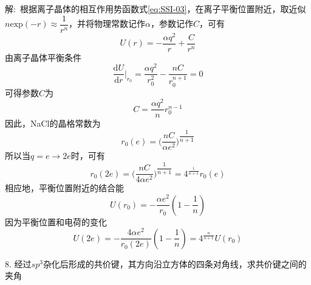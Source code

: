 解:~根据离子晶体的相互作用势函数式\eqref{eq:SSI-03}，在离子平衡位置附近，取近似
$n\mathrm{exp}(-r)\approx\dfrac1{r^n}$，并将物理常数记作$\alpha$，参数记作$C$，可有
\begin{displaymath}
	U(r)=-\dfrac{\alpha q^2}r+\dfrac{C}{r^n}
\end{displaymath}
由离子晶体平衡条件
\begin{displaymath}
	\dfrac{\mathrm{d}U}{\mathrm{d}r}\bigg|_{r_0}=\dfrac{\alpha q^2}{r_0^2}-\dfrac{nC}{r_0^{n+1}}=0
\end{displaymath}
可得参数$C$为
\begin{displaymath}
	C=\dfrac{\alpha q^2}nr_0^{n-1}	
\end{displaymath}
因此，\textrm{NaCl}的晶格常数为
\begin{displaymath}
	r_0(e)=\bigg(\dfrac{nC}{\alpha e^2}\bigg)^{\dfrac{1}{n+1}}
\end{displaymath}
所以当$q=e\rightarrow2e$时，可有
\begin{displaymath}
	r_0(2e)=\bigg(\dfrac{nC}{4\alpha e^2}\bigg)^{\dfrac{1}{n+1}}=4^{\frac{1}{n+1}}r_0(e)
\end{displaymath}
相应地，平衡位置附近的结合能
\begin{displaymath}
	U(r_0)=-\dfrac{\alpha e^2}{r_0}(1-\dfrac1n)
\end{displaymath}
因为平衡位置和电荷的变化
\begin{displaymath}
	U(2e)=-\dfrac{4\alpha e^2}{r_0(2e)}(1-\dfrac1n)=4^{\frac{n}{n+1}}U(r_0)
\end{displaymath}

8. 经过$sp^3$杂化后形成的共价键，其方向沿立方体的四条对角线，求共价键之间的夹角

